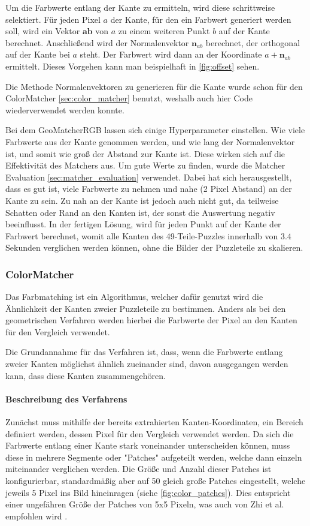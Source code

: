 Um die Farbwerte entlang der Kante zu ermitteln, wird diese schrittweise selektiert. Für jeden Pixel $a$ der Kante, für den ein Farbwert generiert werden soll, wird ein Vektor $\mathbf{ab}$ von $a$ zu einem weiteren Punkt $b$ auf der Kante berechnet. Anschließend wird der Normalenvektor $\mathbf{n}_{ab}$ berechnet, der orthogonal auf der Kante bei $a$ steht. Der Farbwert wird dann an der Koordinate $a + \mathbf{n}_{ab}$ ermittelt. Dieses Vorgehen kann man beispielhaft in \autoref{fig:offset} sehen.

Die Methode Normalenvektoren zu generieren für die Kante wurde schon für den ColorMatcher \autoref{sec:color_matcher} benutzt, weshalb auch hier Code wiederverwendet werden konnte.

Bei dem GeoMatcherRGB lassen sich einige Hyperparameter einstellen. Wie viele Farbwerte aus der Kante genommen werden, und wie lang der Normalenvektor ist, und somit wie groß der Abstand zur Kante ist. Diese wirken sich auf die Effektivität des Matchers aus. Um gute Werte zu finden, wurde die Matcher Evaluation \autoref{sec:matcher_evaluation} verwendet. Dabei hat sich herausgestellt, dass es gut ist, viele Farbwerte zu nehmen und nahe (2 Pixel Abstand) an der Kante zu sein. Zu nah an der Kante ist jedoch auch nicht gut, da teilweise Schatten oder Rand an den Kanten ist, der sonst die Auswertung negativ beeinflusst. In der fertigen Lösung, wird für jeden Punkt auf der Kante der Farbwert berechnet, womit alle Kanten des 49-Teile-Puzzles innerhalb von $3.4$ Sekunden verglichen werden können, ohne die Bilder der Puzzleteile zu skalieren.



\subsubsection[ColorMatcher]{ColorMatcher }
\label{sec:color_matcher}
Das Farbmatching ist ein Algorithmus, welcher dafür genutzt wird die Ähnlichkeit der Kanten zweier Puzzleteile zu bestimmen. Anders als bei den geometrischen Verfahren werden hierbei die Farbwerte der Pixel an den Kanten für den Vergleich verwendet.

Die Grundannahme für das Verfahren ist, dass, wenn die Farbwerte entlang zweier Kanten möglichst ähnlich zueinander sind, davon ausgegangen werden kann, dass diese Kanten zusammengehören. 

\paragraph{Beschreibung des Verfahrens}
Zunächst muss mithilfe der bereits extrahierten Kanten-Koordinaten, ein Bereich definiert werden, dessen Pixel für den Vergleich verwendet werden. Da sich die Farbwerte entlang einer Kante stark voneinander unterscheiden können, muss diese in mehrere Segmente oder "Patches" aufgeteilt werden, welche dann einzeln miteinander verglichen werden. Die Größe und Anzahl dieser Patches ist konfigurierbar, standardmäßig aber auf 50 gleich große Patches eingestellt, welche jeweils 5 Pixel ins Bild hineinragen (siehe \autoref{fig:color_patches}). Dies entspricht einer ungefähren Größe der Patches von 5x5 Pixeln, was auch von Zhi et al. empfohlen wird \cite{image_matching_color}.


